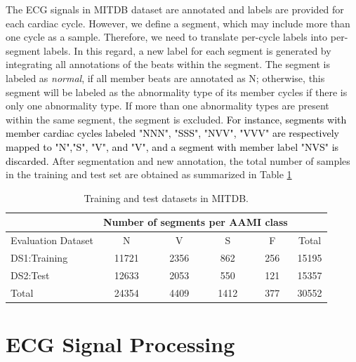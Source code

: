 The ECG signals in MITDB dataset are annotated and labels are provided for each cardiac cycle. However, we define a segment, which may include more than one cycle as a sample. Therefore, we need to translate per-cycle labels into per-segment labels. In this regard, a new label for each segment is generated by integrating all annotations of the beats within the segment. The segment is labeled as \textit{normal}, if all member beats are annotated as N; otherwise, this segment will be labeled as the abnormality type of its member cycles if there is only one abnormality type. If more than one abnormality types are present within the same segment, the segment is excluded. \textcolor{black}{For instance, segments with member cardiac cycles labeled "NNN", "SSS", "NVV", "VVV" are respectively mapped to "N","S", "V", and "V", and a segment with member label "NVS" is discarded.} 
After segmentation and new annotation, the total number of samples in the training and test set are obtained as summarized in Table \ref{table:ds}
\begin{table}[t]
	\centering
	\caption{Training and test datasets in MITDB.}
	\vspace{-0.05in}
	\begin{tabular}{|l||c|c|c|c|c|}
		\hline 
		& \multicolumn{4}{c}{Number of segments per AAMI class} &\\ 
		\hline 
		Evaluation Dataset& N & V & S & F &Total \\ 
		\hline 
		DS1:Training & 11721& 2356 & 862 & 256 & 15195\\ 
		\hline 
		DS2:Test & 12633 & 2053 & 550 & 121 & 15357 \\ 
		\hline 
		Total & 24354 & 4409 & 1412 & 377 & 30552 \\ 
		\hline 
	\end{tabular}
	\label{table:ds} 
	\vspace{-0.15in}
\end{table}

\section{ECG Signal Processing}\label{sec:ecgprocessing}

